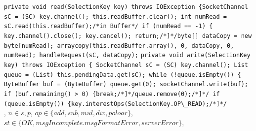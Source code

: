 \lstinline{private void read(SelectionKey key) throws IOException {SocketChannel sC = (SC) key.channel(); this.readBuffer.clear(); int numRead = sC.read(this.readBuffer);/*in Buffer*/ if (numRead == -1) { key.channel().close(); key.cancel(); return;/*]*/byte[] dataCopy = new byte[numRead]; arraycopy(this.readBuffer.array(), 0, dataCopy, 0, numRead); handleRequest(sC, dataCopy);}
\lstinline{private void write(SelectionKey key) throws IOException { SocketChannel sC = (SC) key.channel(); List queue = (List) this.pendingData.get(sC); while (!queue.isEmpty()) { ByteBuffer buf = (ByteBuffer) queue.get(0); socketChannel.write(buf); if (buf.remaining() > 0) {break;/*]*/queue.remove(0);/*]*/ if (queue.isEmpty()) {key.interestOps(SelectionKey.OP\_READ);/*]*/}
\\
, 
$n \in {s,p}$,
$op \in \{add, sub, mul, div, poloar\}$,
 $st\in\{OK,msgIncomplete.msgFormatError,serverError\}$,
\textbar
{}
\redtext{+}
\redtext{+}
